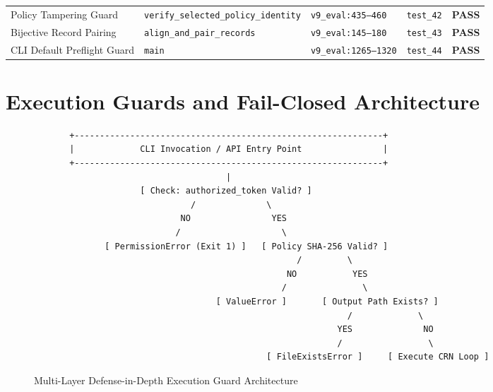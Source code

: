 \documentclass[10pt,a4paper]{article}
\begin{document}
\begin{table}[htbp]
\begin{tabularx}{\textwidth}{lp{4.0cm}Xlc}
Policy Tampering Guard & \texttt{verify\_selected\_policy\_identity} & \texttt{v9\_eval:435--460} & \texttt{test\_42} & \textbf{PASS} \\
Bijective Record Pairing & \texttt{align\_and\_pair\_records} & \texttt{v9\_eval:145--180} & \texttt{test\_43} & \textbf{PASS} \\
CLI Default Preflight Guard & \texttt{main} & \texttt{v9\_eval:1265--1320} & \texttt{test\_44} & \textbf{PASS} \\
\bottomrule
\end{tabularx}
\end{table}

\section{Execution Guards and Fail-Closed Architecture}

\begin{figure}[htbp]
\centering
\small
\begin{verbatim}
       +-------------------------------------------------------------+
       |             CLI Invocation / API Entry Point                |
       +-------------------------------------------------------------+
                                      |
                     [ Check: authorized_token Valid? ]
                               /              \
                             NO                YES
                            /                    \
              [ PermissionError (Exit 1) ]   [ Policy SHA-256 Valid? ]
                                                    /         \
                                                  NO           YES
                                                 /               \
                                    [ ValueError ]       [ Output Path Exists? ]
                                                              /             \
                                                            YES              NO
                                                            /                 \
                                              [ FileExistsError ]     [ Execute CRN Loop ]
\end{verbatim}
\caption{Multi-Layer Defense-in-Depth Execution Guard Architecture}
\label{fig:guard_arch}
\end{figure}
\end{document}
